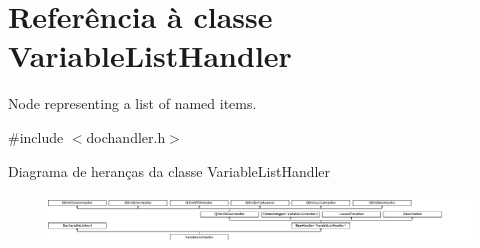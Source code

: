 \hypertarget{class_variable_list_handler}{\section{Referência à classe Variable\-List\-Handler}
\label{class_variable_list_handler}
}


Node representing a list of named items.  




{\ttfamily \#include $<$dochandler.\-h$>$}

Diagrama de heranças da classe Variable\-List\-Handler\begin{figure}[H]
\begin{center}
\leavevmode
\includegraphics[height=1.311475cm]{class_variable_list_handler}
\end{center}
\end{figure}

